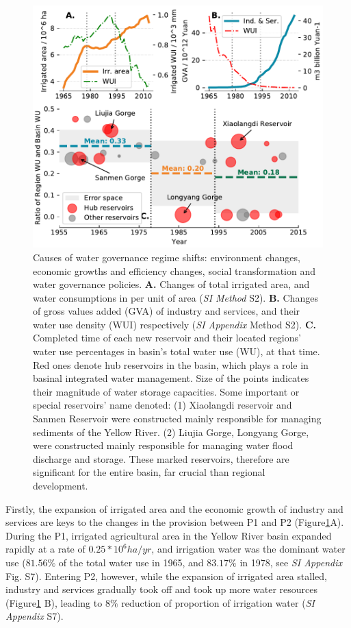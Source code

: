 \documentclass[9pt, twocolumn, twoside, lineno]{pnas-new}
\begin{document}
\begin{figure}[th!]
	\centering
	\includegraphics[width=\linewidth]{../../figures/main/causes.pdf}
	\caption{
		Causes of water governance regime shifts: environment changes, economic growths and efficiency changes, social transformation and water governance policies.
		\textbf{A.} Changes of total irrigated area, and water consumptions in per unit of area (\textit{SI Method} S2).
		\textbf{B.} Changes of gross values added (GVA) of industry and services, and their water use density (WUI) respectively (\textit{SI Appendix} Method S2).
		\textbf{C.} Completed time of each new reservoir and their located regions' water use percentages in basin's total water use (WU), at that time. Red ones denote hub reservoirs in the basin, which plays a role in basinal integrated water management. Size of the points indicates their magnitude of water storage capacities. Some important or special reservoirs' name denoted: (1) Xiaolangdi reservoir and Sanmen Reservoir were constructed mainly responsible for managing sediments of the Yellow River. (2) Liujia Gorge, Longyang Gorge, were constructed mainly responsible for managing water flood discharge and storage. These marked reservoirs, therefore are significant for the entire basin, far crucial than regional development.
	}
	\label{fig:Causes}
\end{figure}

Firstly, the expansion of irrigated area and the economic growth of industry and services are keys to the changes in the provision between P1 and P2 (Figure\ref{fig:Causes}A). During the P1, irrigated agricultural area in the Yellow River basin expanded rapidly at a rate of $0.25*10^6 ha/yr$, and irrigation water was the dominant water use ($81.56\%$ of the total water use in 1965, and $83.17\%$ in 1978, see \textit{SI Appendix} Fig. S7). Entering P2, however, while the expansion of irrigated area stalled, industry and services gradually took off and took up more water resources (Figure\ref{fig:Causes} B), leading to $8\%$ reduction of proportion of irrigation water (\textit{SI Appendix} S7).
\end{document}

